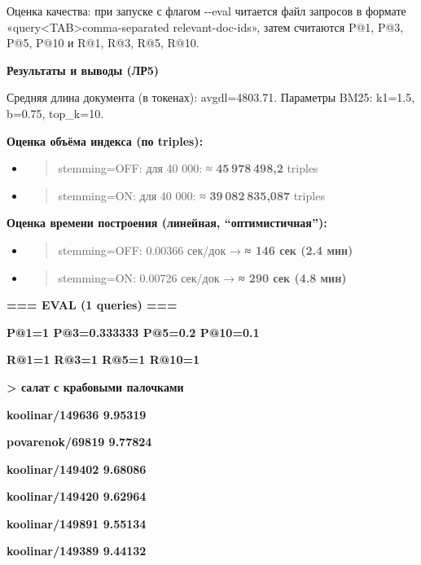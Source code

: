 \documentclass[12pt,a4paper]{article}
\begin{document}
Оценка качества: при запуске с флагом -\/-eval читается файл запросов в
формате «query\textless TAB\textgreater comma-separated
relevant-doc-ids», затем считаются P@1, P@3, P@5, P@10 и R@1, R@3, R@5,
R@10.

\textbf{Результаты и выводы (ЛР5)}

Средняя длина документа (в токенах): avgdl=4803.71. Параметры BM25:
k1=1.5, b=0.75, top\_k=10.

\textbf{Оценка объёма индекса (по triples):}

\begin{itemize}
\item
  \begin{quote}
  stemming=OFF:\textbf{\hfill\break
  } для 40 000: ≈ \textbf{45 978 498,2} triples
  \end{quote}
\item
  \begin{quote}
  stemming=ON:\textbf{\hfill\break
  } для 40 000: ≈ \textbf{39 082 835,087} triples
  \end{quote}
\end{itemize}

\textbf{Оценка времени построения (линейная, ``оптимистичная''):}

\begin{itemize}
\item
  \begin{quote}
  stemming=OFF: 0.00366 сек/док → \textbf{≈ 146 сек (2.4 мин)}
  \end{quote}
\item
  \begin{quote}
  stemming=ON: 0.00726 сек/док → \textbf{≈ 290 сек (4.8 мин)}
  \end{quote}
\end{itemize}

\textbf{=== EVAL (1 queries) ===}

\textbf{P@1=1 P@3=0.333333 P@5=0.2 P@10=0.1}

\textbf{R@1=1 R@3=1 R@5=1 R@10=1}

\textbf{\textgreater{} салат с крабовыми палочками}

\textbf{koolinar/149636 9.95319}

\textbf{povarenok/69819 9.77824}

\textbf{koolinar/149402 9.68086}

\textbf{koolinar/149420 9.62964}

\textbf{koolinar/149891 9.55134}

\textbf{koolinar/149389 9.44132}
\end{document}
